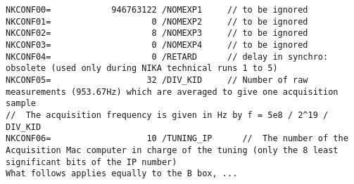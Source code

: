 \documentclass[a4paper,10pt]{article}
\begin{document}
\begin{verbatim}
NKCONF00=            946763122 /NOMEXP1     // to be ignored                                                                          
NKCONF01=                    0 /NOMEXP2     // to be ignored                                                                          
NKCONF02=                    8 /NOMEXP3     // to be ignored                                                                          
NKCONF03=                    0 /NOMEXP4     // to be ignored                                                                          
NKCONF04=                    0 /RETARD      // delay in synchro: obsolete (used only during NIKA technical runs 1 to 5)               
NKCONF05=                   32 /DIV_KID     // Number of raw measurements (953.67Hz) which are averaged to give one acquisition sample
//  The acquisition frequency is given in Hz by f = 5e8 / 2^19 / DIV_KID
NKCONF06=                   10 /TUNING_IP      //  The number of the Acquisition Mac computer in charge of the tuning (only the 8 least significant bits of the IP number)
What follows applies equally to the B box, ...


\end{verbatim}
\end{document}
